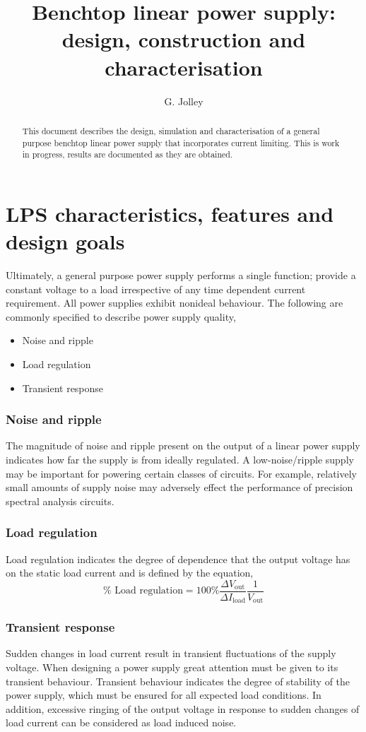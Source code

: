 \documentclass[a4paper,10pt, oneside]{article}
\title{Benchtop linear power supply: design, construction and characterisation}
\author{G. Jolley}
\begin{document}
\maketitle

\begin{abstract}
This document describes the design, simulation and characterisation of a general purpose benchtop linear power supply that incorporates current limiting. This is work in progress, results are documented as they are obtained. 
\end{abstract}

\section{LPS characteristics, features and design goals}
Ultimately, a general purpose power supply performs a single function; provide a constant voltage to a load irrespective of any time dependent current requirement. All power supplies exhibit nonideal behaviour. The following are commonly specified to describe power supply quality,
\begin{itemize}
	\item Noise and ripple
	\item Load regulation
	\item Transient response
\end{itemize}
\subsubsection*{Noise and ripple}
The magnitude of noise and ripple present on the output of a linear power supply indicates how far the supply is from ideally regulated. A low-noise/ripple supply may be important for powering certain classes of circuits. For example, relatively small amounts of supply noise may adversely effect the performance of precision spectral analysis circuits. 
\subsubsection*{Load regulation}
Load regulation indicates the degree of dependence that the output voltage has on the static load current and is defined by the equation,
\begin{equation}
\%\textrm{ Load regulation} = 100\%\frac{\Delta V_{\textrm{out}}}{\Delta I_{\textrm{load}}}\frac{1}{V_{\textrm{out}}}
\end{equation}
\subsubsection*{Transient response}
Sudden changes in load current result in transient fluctuations of the supply voltage. When designing a power supply great attention must be given to its transient behaviour. Transient behaviour indicates the degree of stability of the power supply, which must be ensured for all expected load conditions. In addition, excessive ringing of the output voltage in response to sudden changes of load current can be considered as load induced noise. 
\end{document}
